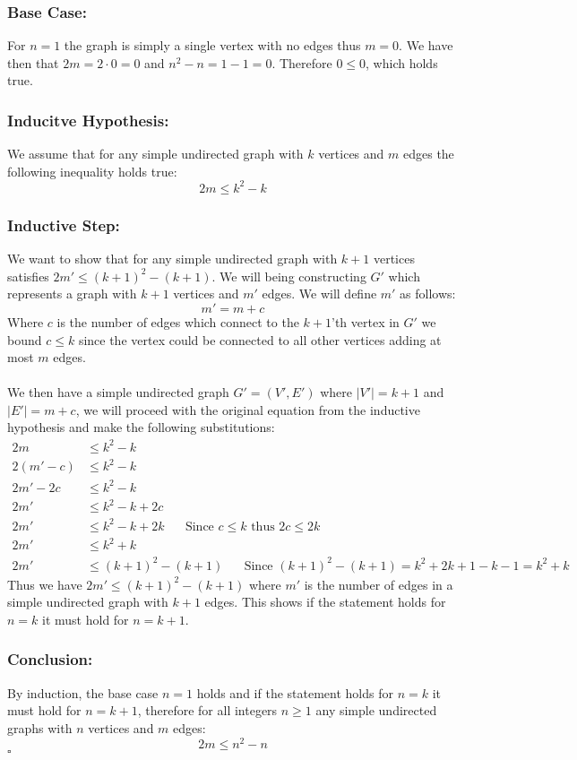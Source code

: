 \documentclass{article}
\begin{document}
\subsubsection*{Base Case:}
For $n=1$ the graph is simply a single vertex with no edges thus $m=0$. We have then that $2m=2\cdot 0=0$ and $n^{2}-n=1-1=0$. Therefore $0\leq 0$, which holds true. 

\subsubsection*{Inducitve Hypothesis:}
We assume that for any simple undirected graph with $k$ vertices and $m$ edges the following inequality holds true: $$2m\leq k^{2}-k$$

\subsubsection*{Inductive Step:}
We want to show that for any simple undirected graph with $k+1$ vertices satisfies $2m'\leq(k+1)^{2}-(k+1)$. We will being constructing $G'$ which represents a graph with $k+1$ vertices and $m'$ edges. We will define $m'$ as follows: $$m'=m+c$$Where $c$ is the number of edges which connect to the $k+1$'th vertex in $G'$ we bound $c\leq k$ since the vertex could be connected to all other vertices adding at most $m$ edges.\\ \\
We then have a simple undirected graph $G'=(V',E')$ where $|V'|=k+1$ and $|E'|=m+c$, we will proceed with the original equation from the inductive hypothesis and make the following substitutions: $$\begin{aligned}
    2m&\leq k^{2}-k\\
    2(m'-c)&\leq k^{2}-k\\
    2m'-2c&\leq k^{2}-k\\
    2m'&\leq k^{2}-k+2c\\
    2m'&\leq k^{2}-k+2k\;\;\;\;\;\;\text{Since $c\leq k$ thus $2c\leq 2k$}\\
    2m'&\leq k^{2}+k\\
    2m'&\leq (k+1)^{2}-(k+1)\;\;\;\;\;\;\text{Since $(k+1)^{2}-(k+1)=k^{2}+2k+1-k-1=k^{2}+k$}
\end{aligned}$$
Thus we have $2m'\leq(k+1)^{2}-(k+1)$ where $m'$ is the number of edges in a simple undirected graph with $k+1$ edges. This shows if the statement holds for $n=k$ it must hold for $n=k+1$.
\subsubsection*{Conclusion:}
By induction, the base case $n=1$ holds and if the statement holds for $n=k$ it must hold for $n=k+1$, therefore for all integers $n\geq 1$ any simple undirected graphs with $n$ vertices and $m$ edges: $$2m\leq n^{2}-n$$ $\square$
\newpage
\end{document}
